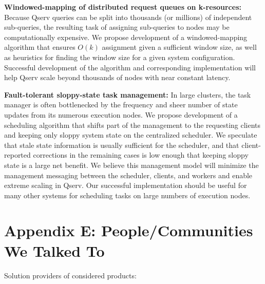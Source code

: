 \documentclass[DM,lsstdraft,toc]{lsstdoc}
\begin{document}
\textbf{Windowed-mapping of distributed request queues on k-resources:}
Because Qserv queries can be split into thousands (or millions) of
independent sub-queries, the resulting task of assigning sub-queries to
nodes may be computationally expensive. We propose development of a
windowed-mapping algorithm that ensures \(O(k)\) assignment given a
sufficient window size, as well as heuristics for finding the window
size for a given system configuration. Successful development of the
algorithm and corresponding implementation will help Qserv scale beyond
thousands of nodes with near constant latency.

\textbf{Fault-tolerant sloppy-state task management:} In large clusters,
the task manager is often bottlenecked by the frequency and sheer number
of state updates from its numerous execution nodes. We propose
development of a scheduling algorithm that shifts part of the management
to the requesting clients and keeping only sloppy system state on the
centralized scheduler. We speculate that stale state information is
usually sufficient for the scheduler, and that client-reported
corrections in the remaining cases is low enough that keeping sloppy
state is a large net benefit. We believe this management model will
minimize the management messaging between the scheduler, clients, and
workers and enable extreme scaling in Qserv. Our successful
implementation should be useful for many other systems for scheduling
tasks on large numbers of execution nodes.

\section{Appendix E: People/Communities We Talked
To}\label{appendix-e-peoplecommunities-we-talked-to}

Solution providers of considered products:
\end{document}
